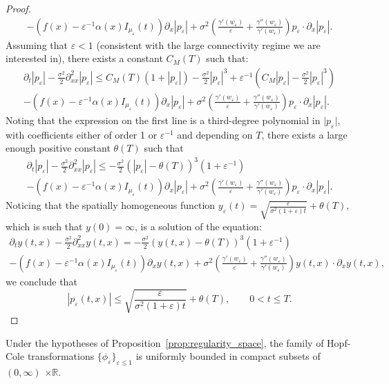 \documentclass[onefignum,onetabnum]{siamart190516}
\newcommand{\R}{\mathbb{R}}
\newcommand{\1}{\mathbbm{1}}
\newcommand{\eps}{\varepsilon}
\begin{document}
\begin{proof}
\begin{multline*}
-  \left( f(x)- \eps^{-1}\alpha(x) I_{\mu_\eps}(t)\right)\partial_x|p_\eps|
 + \sigma^2\left(\frac{\gamma'(w_\eps)}{\eps}+\frac{\gamma''(w_\eps)}{\gamma'(w_\eps)}\right) p_\eps \cdot\partial_x |p_\eps|.
\end{multline*}
Assuming that $\eps<1$ (consistent with the large connectivity regime we are interested in), there exists a constant $C_M(T)$ such that:
\begin{multline*}
\partial_t|p_\eps|-\frac{\sigma^2}{2}\partial^2_{xx}|p_\eps|
\leq C_M(T)(1+|p_\eps|)
- \frac{\sigma^2}2|p_\eps|^3
+\eps^{-1}\left(C_M|p_\eps|- \frac{\sigma^2}2 |p_\eps|^3\right)
\\
-  \left( f(x)- \eps^{-1}\alpha(x) I_{\mu_\eps}(t)\right)\partial_x|p_\eps|
 + \sigma^2\left(\frac{\gamma'(w_\eps)}{\eps}+\frac{\gamma''(w_\eps)}{\gamma'(w_\eps)}\right) p_\eps \cdot\partial_x |p_\eps|. 
\end{multline*}
Noting that the expression on the first line is a third-degree polynomial in $\vert p_\eps\vert$, with coefficients either of order 1 or $\eps^{-1}$ and depending on $T$, there exists a large enough positive constant $\theta(T)$ such that
\begin{multline*}
\partial_t|p_\eps|-\frac{\sigma^2}{2}\partial^2_{xx}|p_\eps|
\leq -\frac{\sigma^2}{2}\left(|p_\eps|-\theta(T)\right)^3(1+\eps^{-1})
\\
-  \left( f(x)- \eps^{-1}\alpha(x) I_{\mu_\eps}(t)\right)\partial_x|p_\eps|
 + \sigma^2\left(\frac{\gamma'(w_\eps)}{\eps}+\frac{\gamma''(w_\eps)}{\gamma'(w_\eps)}\right) p_\eps \cdot\partial_x |p_\eps|.
\end{multline*}
Noticing that the spatially homogeneous function $y_\eps(t) = \sqrt{\frac{\eps}{\sigma^2(1+\eps)t}}+\theta(T),$ which is such that $y(0)=\infty$, is a solution of the equation:
\begin{multline*}
\partial_ty(t,x)-\frac{\sigma^2}{2}\partial^2_{xx}y(t,x)
= -\frac{\sigma^2}{2}\left(y(t,x)-\theta(T)\right)^3(1+\eps^{-1})
\\
-  \left( f(x)- \eps^{-1}\alpha(x) I_{\mu_\eps}(t)\right)\partial_xy(t,x)
 + \sigma^2\left(\frac{\gamma'(w_\eps)}{\eps}+\frac{\gamma''(w_\eps)}{\gamma'(w_\eps)}\right) y(t,x) \cdot\partial_x y(t,x),
\end{multline*}
we conclude that 
\[
|p_\eps(t,x)|\leq  \sqrt{\frac{\eps}{\sigma^2(1+\eps)t}}+\theta(T),\qquad 0<t\leq T. 
\]
\end{proof}

\begin{corollary}
\label{cor:regularity_hc}
Under the hypotheses of Proposition~\ref{prop:regularity_space}, the family of Hopf-Cole transformations $\{\phi_\eps\}_{\eps\leq 1}$ is uniformly bounded in compact subsets of $(0,\infty)$ $\times\R$.
\end{corollary}
\end{document}
